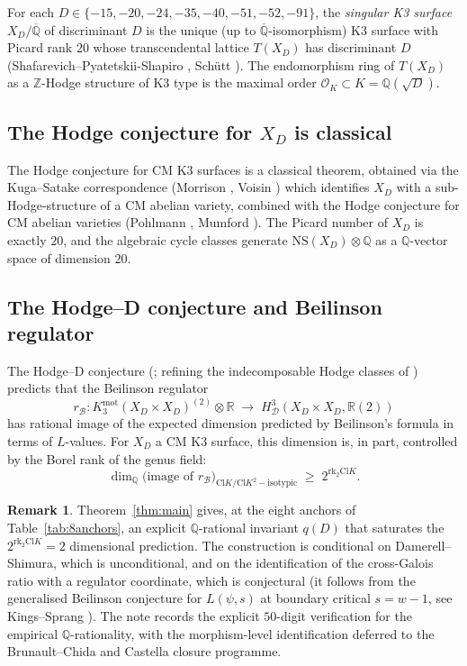 \documentclass[11pt,a4paper]{amsart}
\theoremstyle{plain}
\theoremstyle{definition}
\newtheorem{remark}[theorem]{Remark}
\newcommand{\Q}{\mathbb{Q}}
\newcommand{\Z}{\mathbb{Z}}
\newcommand{\R}{\mathbb{R}}
\newcommand{\OK}{\mathcal{O}_K}
\newcommand{\Cl}{\mathrm{Cl}}
\newcommand{\rkk}{\mathrm{rk}}
\begin{document}
For each $D \in \{-15, -20, -24, -35, -40, -51, -52, -91\}$, the
\emph{singular K3 surface} $X_D / \overline{\Q}$ of discriminant $D$ is
the unique (up to $\overline{\Q}$-isomorphism) K3 surface with Picard
rank $20$ whose transcendental lattice $T(X_D)$ has discriminant $D$
(Shafarevich--Pyatetskii-Shapiro \cite{ShafarevichPS1971},
Schütt \cite{Schutt2008}). The endomorphism ring of $T(X_D)$ as a
$\Z$-Hodge structure of K3 type is the maximal order
$\OK \subset K = \Q(\sqrt D)$.

\subsection{The Hodge conjecture for $X_D$ is classical}

The Hodge conjecture for CM K3 surfaces is a classical theorem,
obtained via the Kuga--Satake correspondence
(Morrison \cite{Morrison1985}, Voisin \cite{Voisin2002}) which
identifies $X_D$ with a sub-Hodge-structure of a CM abelian variety,
combined with the Hodge conjecture for CM abelian varieties
(Pohlmann \cite{Pohlmann1968}, Mumford \cite{Mumford1969}). The
Picard number of $X_D$ is exactly $20$, and the algebraic cycle
classes generate $\mathrm{NS}(X_D) \otimes \Q$ as a $\Q$-vector space
of dimension $20$.

\subsection{The Hodge--D conjecture and Beilinson regulator}

The Hodge--D conjecture
(\cite[\S 1]{ChenLewis2007}; refining the indecomposable Hodge classes
of \cite{Beilinson1985}) predicts that the Beilinson regulator
\[
  r_\mathcal{B} : K_3^{\mathrm{mot}}(X_D \times X_D)^{(2)} \otimes \R
                  \;\longrightarrow\; H^3_\mathcal{D}(X_D \times X_D, \R(2))
\]
has rational image of the expected dimension predicted by Beilinson's
formula in terms of $L$-values. For $X_D$ a CM K3 surface, this
dimension is, in part, controlled by the Borel rank of the genus field:
\[
  \dim_\Q
   \bigl( \text{image of } r_\mathcal{B} \bigr)_{\Cl K/\Cl K^2-\text{isotypic}}
   \;\geq\; 2^{\rkk_2 \Cl K}.
\]

\begin{remark}\label{rk:hodgeD-instantiation}
Theorem~\ref{thm:main} gives, at the eight anchors of
Table~\ref{tab:8anchors}, an explicit $\Q$-rational invariant $q(D)$ that
saturates the $2^{\rkk_2 \Cl K} = 2$ dimensional prediction. The
construction is conditional on Damerell--Shimura, which is
unconditional, and on the identification of the cross-Galois ratio with a
regulator coordinate, which is conjectural (it follows from the
generalised Beilinson conjecture for $L(\psi, s)$ at boundary critical
$s = w - 1$, see Kings--Sprang \cite[\S 6]{KingsSprang2025}). The note
records the explicit $50$-digit verification for the empirical
$\Q$-rationality, with the morphism-level identification deferred to
the Brunault--Chida \cite{BrunaultChida2015} and Castella
\cite{Castella2024} closure programme.
\end{remark}
\end{document}

